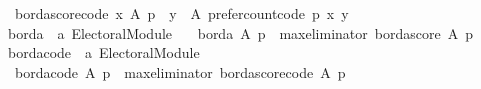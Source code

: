 \begin{isabellebody}
\ \ {\isachardoublequoteopen}borda{\isacharunderscore}{\kern0pt}score{\isacharunderscore}{\kern0pt}code\ x\ A\ p\ {\isacharequal}{\kern0pt}\ {\isacharparenleft}{\kern0pt}{\isasymSum}y\ {\isasymin}\ A{\isachardot}{\kern0pt}\ {\isacharparenleft}{\kern0pt}prefer{\isacharunderscore}{\kern0pt}count{\isacharunderscore}{\kern0pt}code\ p\ x\ y{\isacharparenright}{\kern0pt}{\isacharparenright}{\kern0pt}{\isachardoublequoteclose}\isanewline
\isanewline
{}\isamarkupfalse%
\ borda\ {\isacharcolon}{\kern0pt}{\isacharcolon}{\kern0pt}\ {\isachardoublequoteopen}{\isacharprime}{\kern0pt}a\ Electoral{\isacharunderscore}{\kern0pt}Module{\isachardoublequoteclose}\ \isanewline
\ \ {\isachardoublequoteopen}borda\ A\ p\ {\isacharequal}{\kern0pt}\ max{\isacharunderscore}{\kern0pt}eliminator\ borda{\isacharunderscore}{\kern0pt}score\ A\ p{\isachardoublequoteclose}\isanewline
\isanewline
{}\isamarkupfalse%
\ borda{\isacharunderscore}{\kern0pt}code\ {\isacharcolon}{\kern0pt}{\isacharcolon}{\kern0pt}\ {\isachardoublequoteopen}{\isacharprime}{\kern0pt}a\ Electoral{\isacharunderscore}{\kern0pt}Module{\isachardoublequoteclose}\ \isanewline
\ \ {\isachardoublequoteopen}borda{\isacharunderscore}{\kern0pt}code\ A\ p\ {\isacharequal}{\kern0pt}\ {\isacharparenleft}{\kern0pt}max{\isacharunderscore}{\kern0pt}eliminator\ borda{\isacharunderscore}{\kern0pt}score{\isacharunderscore}{\kern0pt}code{\isacharparenright}{\kern0pt}\ A\ p{\isachardoublequoteclose}\isanewline
%
\isadelimtheory
\isanewline
%
\endisadelimtheory
%
\isatagtheory
{}\isamarkupfalse%
%
\endisatagtheory
{\isafoldtheory}%
%
\isadelimtheory
%
\endisadelimtheory
%
\end{isabellebody}%
\endinput
